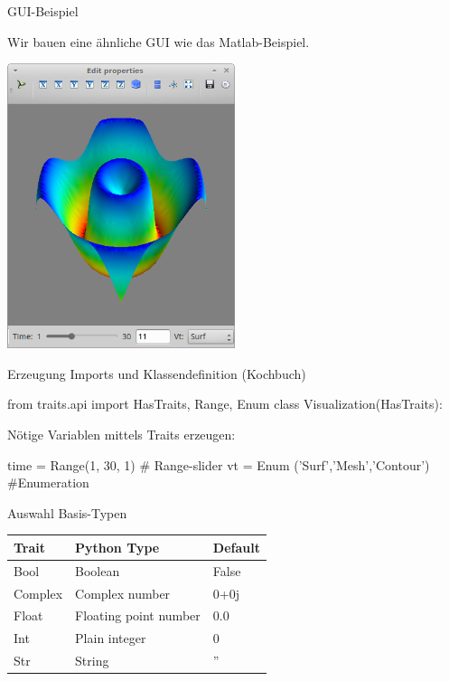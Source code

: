 \documentclass[hyperref={xetex}]{beamer}
\begin{document}
\begin{frame}[fragile]{GUI-Beispiel}

Wir bauen eine ähnliche GUI wie das Matlab-Beispiel. 
\begin{center}
\includegraphics[width=0.5\textwidth]{./figures/traitsui_sc.png}
\end{center}
\end{frame}

\begin{frame}[fragile]{Erzeugung}
Imports und Klassendefinition (Kochbuch)
  \begin{pyin}
from traits.api import HasTraits, Range, Enum
class Visualization(HasTraits):
\end{pyin}

Nötige Variablen mittels Traits erzeugen:
\begin{pyin}
time = Range(1, 30, 1) # Range-slider
vt = Enum ('Surf','Mesh','Contour') #Enumeration
  \end{pyin}

Auswahl Basis-Typen\\
\begin{tabular}[c]{lll}
  \textbf{Trait} & \textbf{Python Type} & \textbf{Default} \\\hline
  Bool & Boolean & False \\
  Complex & Complex number & 0+0j\\
  Float & Floating point number & 0.0 \\
  Int & Plain integer & 0\\
  Str & String &  ''\\
\end{tabular}

\end{frame}
\end{document}
